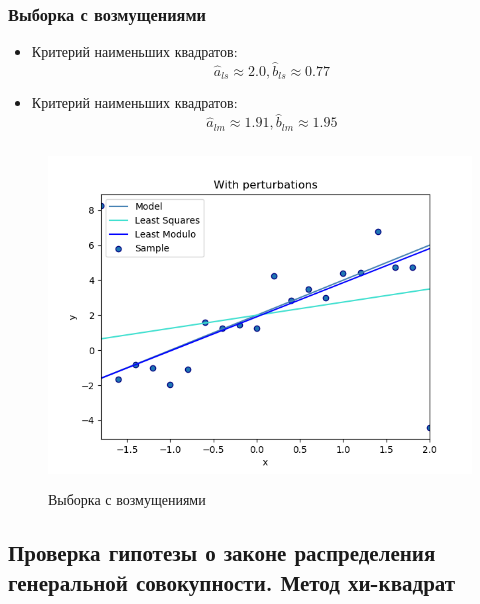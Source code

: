 \documentclass[../body.tex]{subfiles}
\begin{document}
	\subsubsection{Выборка с возмущениями}
	\begin{itemize}
		\item Критерий наименьших квадратов: $$\hat{a}_{ls} \approx 2.0, \hat{b}_{ls} \approx 0.77$$
		\item Критерий наименьших квадратов: $$\hat{a}_{lm} \approx 1.91, \hat{b}_{lm} \approx 1.95$$
	\end{itemize}
	
	\begin{figure}[H]
		\centering
		\includegraphics[width = 12cm, height = 9cm]{img/With perturbations.png}
		\caption{Выборка с возмущениями}
		\label{with}
	\end{figure}

	\subsection{Проверка гипотезы о законе распределения генеральной совокупности. Метод хи-квадрат}	
\end{document}
